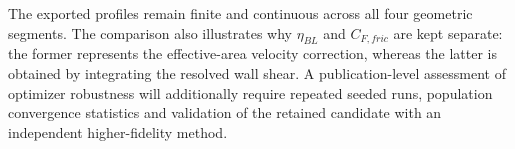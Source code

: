 The exported profiles remain finite and continuous across all four geometric
segments. The comparison also illustrates why \(\eta_{BL}\) and \(C_{F,fric}\) are
kept separate: the former represents the effective-area velocity correction, whereas
the latter is obtained by integrating the resolved wall shear. A publication-level
assessment of optimizer robustness will additionally require repeated seeded runs,
population convergence statistics and validation of the retained candidate with an
independent higher-fidelity method.
